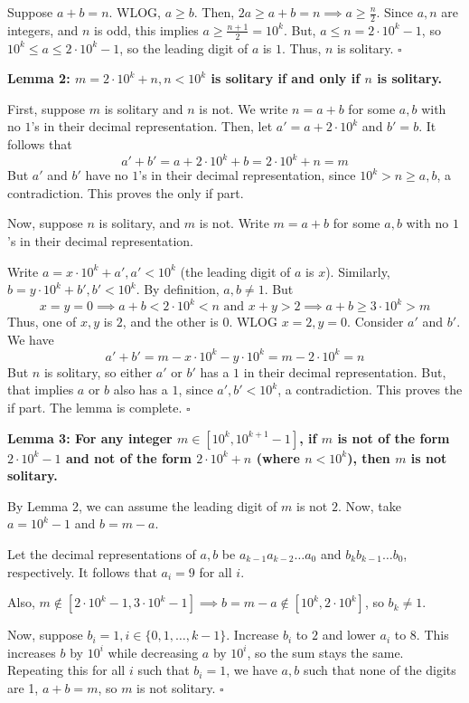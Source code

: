 \begin{enumerate}
 Suppose $a+b=n$. WLOG, $a\geq b$. Then, $2a\geq a+b=n\implies a \geq \frac{n}{2}$. Since $a, n$ are integers, and $n$ is odd, this implies $a \geq \frac{n+1}{2}=10^k$. But, $a\leq n = 2\cdot 10^k-1$, so $10^k \leq a \leq 2\cdot 10^k-1$, so the leading digit of $a$ is $1$. Thus, $n$ is solitary. $\square$

 
\textbf{Lemma 2: $m=2\cdot 10^k+n, n < 10^k$ is solitary if and only if $n$ is solitary.}

 First, suppose $m$ is solitary and $n$ is not. We write $n=a+b$ for some $a, b$ with no $1$'s in their decimal representation. Then, let $a' = a +2\cdot 10^k$ and $b' = b$. It follows that 
 \[a'+b' = a+2\cdot 10^k+b=2\cdot 10^k+n=m\]But $a'$ and $b'$ have no $1$'s in their decimal representation, since $10^k > n \geq a, b$, a contradiction. This proves the only if part.

 
Now, suppose $n$ is solitary, and $m$ is not. Write $m=a+b$ for some $a, b$ with no $1$'s in their decimal representation.

 Write $a = x\cdot 10^k+a', a'< 10^k$ (the leading digit of $a$ is $x$). Similarly, $b = y\cdot 10^k+b', b'< 10^k$. By definition, $a, b \neq 1$. But 
 \[x=y=0\implies a+b< 2\cdot 10^k < n \text{ and } x + y > 2\implies a+b\geq 3\cdot 10^k > m\] Thus, one of $x, y$ is $2$, and the other is $0$. WLOG $x=2, y=0$. Consider $a'$ and $b'$. We have 
 \[a'+b' = m- x\cdot 10^k -y\cdot 10^k =m - 2\cdot 10^k = n\] But $n$ is solitary, so either $a'$ or $b'$ has a $1$ in their decimal representation. But, that implies $a$ or $b$ also has a $1$, since $a', b' < 10^k$, a contradiction. This proves the if part. The lemma is complete. $\square$

 
\textbf{Lemma 3: For any integer $m \in [10^k, 10^{k+1}-1]$, if $m$ is not of the form $2\cdot 10^k - 1$ and not of the form $2\cdot 10^k + n$ (where $n < 10^k$), then $m$ is not solitary.}

 By Lemma 2, we can assume the leading digit of $m$ is not $2$. Now, take $a=10^k-1$ and $b = m-a$. 

 Let the decimal representations of $a, b$ be $a_{k-1}a_{k-2}\dots a_0$ and $b_kb_{k-1}\dots b_0$, respectively. It follows that $a_i=9$ for all $i$. 

 Also, $m\notin [2\cdot 10^k-1, 3\cdot 10^k-1]\implies b = m-a \notin [10^k, 2\cdot 10^k]$, so $b_k\neq 1$. 

 
Now, suppose $b_i = 1, i\in \{0, 1, \dots, k-1\}$. Increase $b_i$ to $2$ and lower $a_i$ to $8$. This increases $b$ by $10^i$ while decreasing $a$ by $10^i$, so the sum stays the same. Repeating this for all $i$ such that $b_i=1$, we have $a, b$ such that none of the digits are 1, $a+b=m$, so $m$ is not solitary. $\square$


\end{enumerate}
